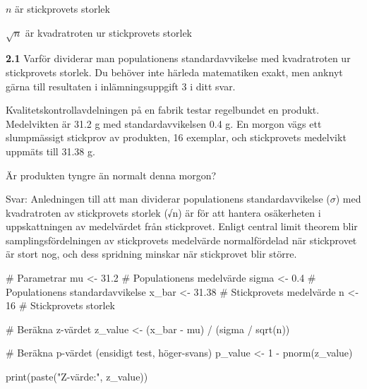 \documentclass[
  letterpaper,
  DIV=11,
  numbers=noendperiod]{scrartcl}
\newenvironment{Shaded}{\begin{snugshade}}{\end{snugshade}}
\newcommand{\CommentTok}[1]{\textcolor[rgb]{0.37,0.37,0.37}{#1}}
\newcommand{\DecValTok}[1]{\textcolor[rgb]{0.68,0.00,0.00}{#1}}
\newcommand{\FloatTok}[1]{\textcolor[rgb]{0.68,0.00,0.00}{#1}}
\newcommand{\FunctionTok}[1]{\textcolor[rgb]{0.28,0.35,0.67}{#1}}
\newcommand{\NormalTok}[1]{\textcolor[rgb]{0.00,0.23,0.31}{#1}}
\newcommand{\OtherTok}[1]{\textcolor[rgb]{0.00,0.23,0.31}{#1}}
\newcommand{\SpecialCharTok}[1]{\textcolor[rgb]{0.37,0.37,0.37}{#1}}
\newcommand{\StringTok}[1]{\textcolor[rgb]{0.13,0.47,0.30}{#1}}
\begin{document}
\(n\) är stickprovets storlek

\({\sqrt{n}}\) är kvadratroten ur stickprovets storlek

\textbf{2.1} Varför dividerar man populationens standardavvikelse med
kvadratroten ur stickprovets storlek. Du behöver inte härleda
matematiken exakt, men anknyt gärna till resultaten i inlämningsuppgift
3 i ditt svar.

Kvalitetskontrollavdelningen på en fabrik testar regelbundet en produkt.
Medelvikten är 31.2 g med standardavvikelsen 0.4 g. En morgon vägs ett
slumpmässigt stickprov av produkten, 16 exemplar, och stickprovets
medelvikt uppmäts till 31.38 g.

Är produkten tyngre än normalt denna morgon?

\hfill\break
Svar: Anledningen till att man dividerar populationens standardavvikelse
(\(\sigma\)) med kvadratroten av stickprovets storlek (√n) är för att
hantera osäkerheten i uppskattningen av medelvärdet från stickprovet.
Enligt central limit theorem blir samplingsfördelningen av stickprovets
medelvärde normalfördelad när stickprovet är stort nog, och dess
spridning minskar när stickprovet blir större.\\

\begin{Shaded}
\begin{Highlighting}[]
\CommentTok{\# Parametrar}
\NormalTok{mu }\OtherTok{\textless{}{-}} \FloatTok{31.2}          \CommentTok{\# Populationens medelvärde}
\NormalTok{sigma }\OtherTok{\textless{}{-}} \FloatTok{0.4}        \CommentTok{\# Populationens standardavvikelse}
\NormalTok{x\_bar }\OtherTok{\textless{}{-}} \FloatTok{31.38}      \CommentTok{\# Stickprovets medelvärde}
\NormalTok{n }\OtherTok{\textless{}{-}} \DecValTok{16}             \CommentTok{\# Stickprovets storlek}

\CommentTok{\# Beräkna z{-}värdet}
\NormalTok{z\_value }\OtherTok{\textless{}{-}}\NormalTok{ (x\_bar }\SpecialCharTok{{-}}\NormalTok{ mu) }\SpecialCharTok{/}\NormalTok{ (sigma }\SpecialCharTok{/} \FunctionTok{sqrt}\NormalTok{(n))}

\CommentTok{\# Beräkna p{-}värdet (ensidigt test, höger{-}svans)}
\NormalTok{p\_value }\OtherTok{\textless{}{-}} \DecValTok{1} \SpecialCharTok{{-}} \FunctionTok{pnorm}\NormalTok{(z\_value)}

\FunctionTok{print}\NormalTok{(}\FunctionTok{paste}\NormalTok{(}\StringTok{"Z{-}värde:"}\NormalTok{, z\_value))}
\end{Highlighting}
\end{Shaded}
\end{document}
